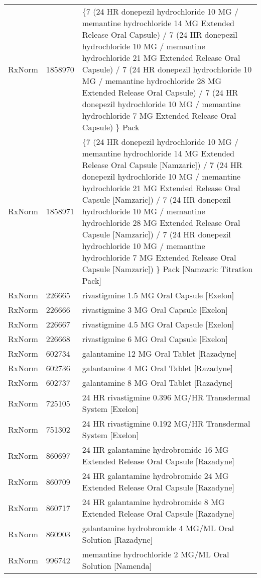 \begin{longtable}{p{}p{}p{}}
  RxNorm & 1858970 & \{7 (24 HR donepezil hydrochloride 10 MG / memantine hydrochloride 14 MG Extended Release Oral Capsule) / 7 (24 HR donepezil hydrochloride 10 MG / memantine hydrochloride 21 MG Extended Release Oral Capsule) / 7 (24 HR donepezil hydrochloride 10 MG / memantine hydrochloride 28 MG Extended Release Oral Capsule) / 7 (24 HR donepezil hydrochloride 10 MG / memantine hydrochloride 7 MG Extended Release Oral Capsule) \} Pack \\ 
  RxNorm & 1858971 & \{7 (24 HR donepezil hydrochloride 10 MG / memantine hydrochloride 14 MG Extended Release Oral Capsule [Namzaric]) / 7 (24 HR donepezil hydrochloride 10 MG / memantine hydrochloride 21 MG Extended Release Oral Capsule [Namzaric]) / 7 (24 HR donepezil hydrochloride 10 MG / memantine hydrochloride 28 MG Extended Release Oral Capsule [Namzaric]) / 7 (24 HR donepezil hydrochloride 10 MG / memantine hydrochloride 7 MG Extended Release Oral Capsule [Namzaric]) \} Pack [Namzaric Titration Pack] \\ 
  RxNorm & 226665 & rivastigmine 1.5 MG Oral Capsule [Exelon] \\ 
  RxNorm & 226666 & rivastigmine 3 MG Oral Capsule [Exelon] \\ 
  RxNorm & 226667 & rivastigmine 4.5 MG Oral Capsule [Exelon] \\ 
  RxNorm & 226668 & rivastigmine 6 MG Oral Capsule [Exelon] \\ 
  RxNorm & 602734 & galantamine 12 MG Oral Tablet [Razadyne] \\ 
  RxNorm & 602736 & galantamine 4 MG Oral Tablet [Razadyne] \\ 
  RxNorm & 602737 & galantamine 8 MG Oral Tablet [Razadyne] \\ 
  RxNorm & 725105 & 24 HR rivastigmine 0.396 MG/HR Transdermal System [Exelon] \\ 
  RxNorm & 751302 & 24 HR rivastigmine 0.192 MG/HR Transdermal System [Exelon] \\ 
  RxNorm & 860697 & 24 HR galantamine hydrobromide 16 MG Extended Release Oral Capsule [Razadyne] \\ 
  RxNorm & 860709 & 24 HR galantamine hydrobromide 24 MG Extended Release Oral Capsule [Razadyne] \\ 
  RxNorm & 860717 & 24 HR galantamine hydrobromide 8 MG Extended Release Oral Capsule [Razadyne] \\ 
  RxNorm & 860903 & galantamine hydrobromide 4 MG/ML Oral Solution [Razadyne] \\ 
  RxNorm & 996742 & memantine hydrochloride 2 MG/ML Oral Solution [Namenda] \\ 

\end{longtable}
